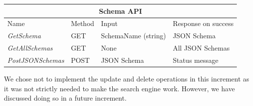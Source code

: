 \begin{table}[]
\begin{tabular}{|llll|}
\hline
\multicolumn{4}{|c|}{\textbf{Schema API}}                                                                                                     \\ \hline
\multicolumn{1}{|l|}{Name}                     & \multicolumn{1}{l|}{Method} & \multicolumn{1}{l|}{Input}               & Response on success \\ \hline
\multicolumn{1}{|l|}{\textit{GetSchema}}       & \multicolumn{1}{l|}{GET}    & \multicolumn{1}{l|}{SchemaName (string)} & JSON Schema         \\ \hline
\multicolumn{1}{|l|}{\textit{GetAllSchemas}}   & \multicolumn{1}{l|}{GET}    & \multicolumn{1}{l|}{None}                & All JSON Schemas    \\ \hline
\multicolumn{1}{|l|}{\textit{PostJSONSchemas}} & \multicolumn{1}{l|}{POST}   & \multicolumn{1}{l|}{JSON Schema}         & Status message      \\ \hline
\end{tabular}
\end{table}


We chose not to implement the update and delete operations in this increment as it was not strictly needed to make the search engine work.
However, we have discussed doing so in a future increment.